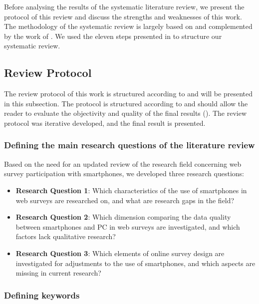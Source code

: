Before analysing the results of the systematic literature review, we present the protocol of this review and discuss the strengths and weaknesses of this work. The methodology of the systematic review is largely based on \cite{weidt_systematic_2016} and complemented by the work of \cite{xiao_guidance_2017,petticrew_systematic_2008,snyder_literature_2019,denyer_producing_2009}. We used the eleven steps presented in \cite{weidt_systematic_2016} to structure our systematic review.

\subsection{Review Protocol}

The review protocol of this work is structured according to \cite{weidt_systematic_2016} and will be presented in this subsection. The protocol is structured according to \cite{weidt_systematic_2016} and should allow the reader to evaluate the objectivity and quality of the final results (\cite{page_prisma_2021}). The review protocol was iterative developed, and the final result is presented.


\subsubsection{Defining the main research questions of the literature review}

Based on the need for an updated review of the research field concerning web survey participation with smartphones, we developed three research questions:

\begin{itemize}
   \item \textbf{Research Question 1}: Which characteristics of the use of smartphones in web surveys are researched on, and what are research gaps in the field? 
   \item \textbf{Research Question 2}: Which dimension comparing the data quality between smartphones and PC in web surveys are investigated, and which factors lack qualitative research?
   \item \textbf{Research Question 3}: Which elements of online survey design are investigated for adjustments to the use of smartphones, and which aspects are missing in current research?
\end{itemize}

\subsubsection{Defining keywords}
\label{subsubsec: Defining search string}

